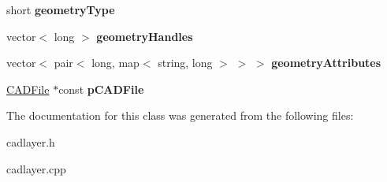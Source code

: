 \begin{DoxyCompactItemize}
\item 
short {\bfseries geometry\+Type}\hypertarget{class_c_a_d_layer_a3d9b70a9eb88b5cf23011b58077d1951}{}\label{class_c_a_d_layer_a3d9b70a9eb88b5cf23011b58077d1951}

\item 
vector$<$ long $>$ {\bfseries geometry\+Handles}\hypertarget{class_c_a_d_layer_adee3d1116628797ae976f57fb1b874f4}{}\label{class_c_a_d_layer_adee3d1116628797ae976f57fb1b874f4}

\item 
vector$<$ pair$<$ long, map$<$ string, long $>$ $>$ $>$ {\bfseries geometry\+Attributes}\hypertarget{class_c_a_d_layer_a76f3c61328890c75928b3e8ea26bc551}{}\label{class_c_a_d_layer_a76f3c61328890c75928b3e8ea26bc551}

\item 
\hyperlink{class_c_a_d_file}{C\+A\+D\+File} $\ast$const {\bfseries p\+C\+A\+D\+File}\hypertarget{class_c_a_d_layer_aae8a4ce8ab88ce7263dc2d483e8e9253}{}\label{class_c_a_d_layer_aae8a4ce8ab88ce7263dc2d483e8e9253}

\end{DoxyCompactItemize}


The documentation for this class was generated from the following files\+:\begin{DoxyCompactItemize}
\item 
cadlayer.\+h\item 
cadlayer.\+cpp\end{DoxyCompactItemize}
